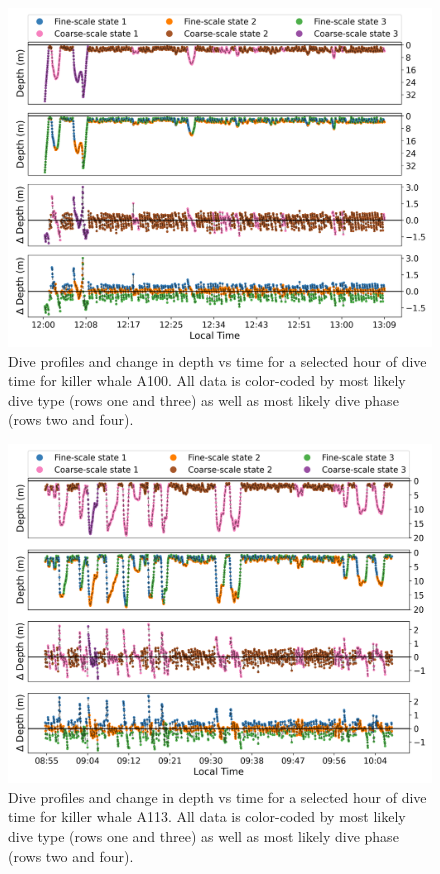 \documentclass[12pt]{article}
\begin{document}
\begin{figure}[H]
    \centering
    \includegraphics[width=6.5in]{../plt/decoded_dives_kw_A100_K_3_3_nWhales_8.png}
    \caption{Dive profiles and change in depth vs time for a selected hour of dive time for killer whale A100. All data is color-coded by most likely dive type (rows one and three) as well as most likely dive phase (rows two and four).}
    \label{fig:A100}
\end{figure}

\begin{figure}[H]
    \centering
    \includegraphics[width=6.5in]{../plt/decoded_dives_kw_A113_K_3_3_nWhales_8.png}
    \caption{Dive profiles and change in depth vs time for a selected hour of dive time for killer whale A113. All data is color-coded by most likely dive type (rows one and three) as well as most likely dive phase (rows two and four).}
    \label{fig:A113}
\end{figure}
\end{document}

